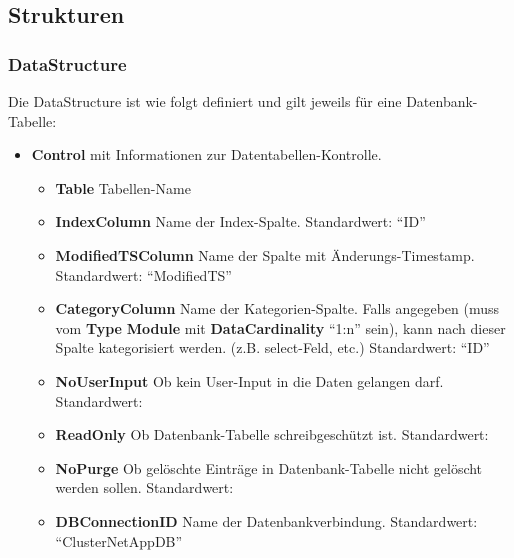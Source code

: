     \subsection{Strukturen}
        \subsubsection{DataStructure}
            Die DataStructure ist wie folgt definiert und gilt jeweils für eine Datenbank-Tabelle:
            \begin{itemize}
                \item \textbf{Control}
                     mit Informationen zur Datentabellen-Kontrolle.
                    \begin{itemize}
                        \item \textbf{Table}\superscript{*}  Tabellen-Name
                        \item \textbf{IndexColumn}\superscript{*}  Name der Index-Spalte. Standardwert: ``ID''
                        \item \textbf{ModifiedTSColumn}\superscript{*}  Name der Spalte mit Änderungs-Timestamp. Standardwert: ``ModifiedTS''
                        \item \textbf{CategoryColumn}\superscript{*}  Name der Kategorien-Spalte. Falls angegeben (muss vom \textbf{Type} \textbf{Module} mit \textbf{DataCardinality} ``1:n'' sein), kann nach
                        dieser Spalte kategorisiert werden. (z.B. select-Feld, etc.) Standardwert: ``ID''
                        \item \textbf{NoUserInput}\superscript{*}  Ob kein User-Input in die Daten gelangen darf. Standardwert:  
                        \item \textbf{ReadOnly}\superscript{*}  Ob Datenbank-Tabelle schreibgeschützt ist. Standardwert:  
                        \item \textbf{NoPurge}\superscript{*}  Ob gelöschte Einträge in Datenbank-Tabelle nicht gelöscht werden sollen. Standardwert:  
                        \item \textbf{DBConnectionID}\superscript{*}  Name der Datenbankverbindung. Standardwert: ``ClusterNetAppDB''


\end{itemize}
\end{itemize}
